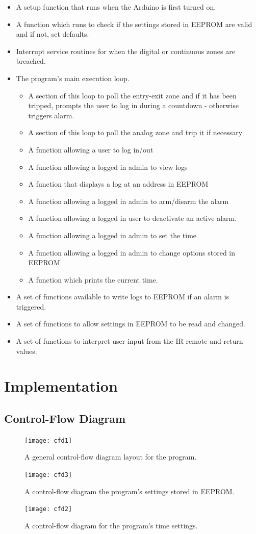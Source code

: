 \documentclass[a4paper,11pt]{article}
\theoremstyle{mytheor}
\begin{document}
\begin{itemize}
\item A setup function that runs when the Arduino is first turned on.
\item A function which runs to check if the settings stored in EEPROM are valid and if not, set defaults.
\item Interrupt service routines for when the digital or continuous zones are breached.
\item The program's main execution loop.
\begin{itemize}
\item A section of this loop to poll the entry-exit zone and if it has been tripped, prompts the user to log in during a countdown - otherwise triggers alarm. 
\item A section of this loop to poll the analog zone and trip it if necessary
\item A function allowing a user to log in/out
\item A function allowing a logged in admin to view logs
\item A function that displays a log at an address in EEPROM
\item A function allowing a logged in admin to arm/disarm the alarm
\item A function allowing a logged in user to deactivate an active alarm.
\item A function allowing a logged in admin to set the time
\item A function allowing a logged in admin to change options stored in EEPROM
\item A function which prints the current time.
\end{itemize}
\item A set of functions available to write logs to EEPROM if an alarm is triggered.
\item A set of functions to allow settings in EEPROM to be read and changed.
\item A set of functions to interpret user input from the IR remote and return values.
\end{itemize}

\section{Implementation}

\subsection{Control-Flow Diagram}
\newpage
\begin{figure}[h!]
\caption{A general control-flow diagram layout for the program.}
\centering
\texttt{[image: cfd1]}
\end{figure}
\begin{figure}[h!]
\caption{A control-flow diagram the program's settings stored in EEPROM.}
\centering
\texttt{[image: cfd3]}
\end{figure}
\begin{figure}[h!]
\caption{A control-flow diagram for the program's time settings.}
\centering
\texttt{[image: cfd2]}
\end{figure}
\end{document}
